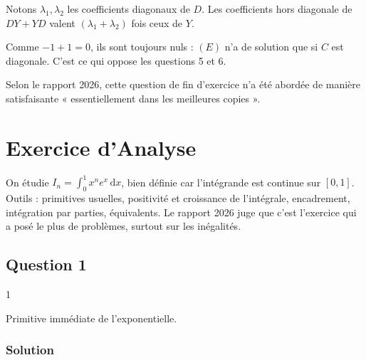 \documentclass[11pt,a4paper]{article}
\newcommand{\equationajustee}[1]{%
  \sbox{\boiteequation}{$\displaystyle #1$}%
  \ifdim\wd\boiteequation>\linewidth
    \[\resizebox{\linewidth}{!}{\usebox{\boiteequation}}\]%
  \else
    \[#1\]%
  \fi}
\begin{document}
\begin{methode}

Notons \(\lambda_1,\lambda_2\) les coefficients diagonaux de \(D\). Les coefficients hors diagonale de \(DY+YD\) valent \((\lambda_1+\lambda_2)\) fois ceux de \(Y\).

Comme \(-1+1=0\), ils sont toujours nuls : \((E)\) n'a de solution que si \(C\) est diagonale. C'est ce qui oppose les questions 5 et 6.

\end{methode}

\begin{jury}

Selon le rapport 2026, cette question de fin d'exercice n'a été abordée de manière satisfaisante « essentiellement dans les meilleures copies ».

\end{jury}

\hypertarget{exercice-danalyse}{%
\section{Exercice d'Analyse}\label{exercice-danalyse}}

On étudie \(I_n=\int_0^1x^ne^x\,\mathrm dx\), bien définie car l'intégrande est continue sur \([0,1]\). Outils : primitives usuelles, positivité et croissance de l'intégrale, encadrement, intégration par parties, équivalents. Le rapport 2026 juge que c'est l'exercice qui a posé le plus de problèmes, surtout sur les inégalités.

\hypertarget{question-1-1}{%
\subsection{Question 1}\label{question-1-1}}

\begin{indication}{1}

Primitive immédiate de l'exponentielle.

\end{indication}

\hypertarget{solution-10}{%
\subsubsection{Solution}\label{solution-10}}

\equationajustee{\begin{aligned}
I_0&=\int_0^1e^x\,\mathrm dx\\
&=\big[e^x\big]_0^1\\
&=e^1-e^0.
\end{aligned}}
\end{document}
